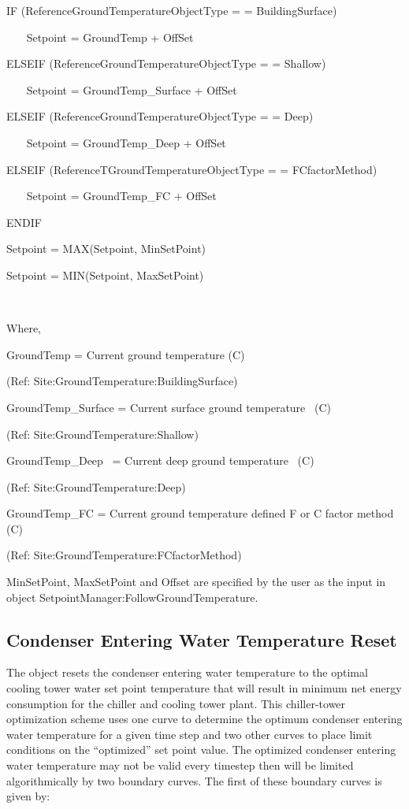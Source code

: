 IF (ReferenceGroundTemperatureObjectType = = BuildingSurface)

~~~ Setpoint = GroundTemp + OffSet

ELSEIF (ReferenceGroundTemperatureObjectType = = Shallow)

~~~ Setpoint = GroundTemp\_Surface + OffSet

ELSEIF (ReferenceGroundTemperatureObjectType = = Deep)

~~~ Setpoint = GroundTemp\_Deep + OffSet

ELSEIF (ReferenceTGroundTemperatureObjectType = = FCfactorMethod)

~~~ Setpoint = GroundTemp\_FC + OffSet

ENDIF

Setpoint = MAX(Setpoint, MinSetPoint)

Setpoint = MIN(Setpoint, MaxSetPoint)

\emph{~}

Where,

GroundTemp = Current ground temperature (C)

(Ref: Site:GroundTemperature:BuildingSurface)

GroundTemp\_Surface = Current surface ground temperature~ (C)

(Ref: Site:GroundTemperature:Shallow)

GroundTemp\_Deep~ = Current deep ground temperature~ (C)

(Ref: Site:GroundTemperature:Deep)

GroundTemp\_FC = Current ground temperature defined F or C factor method (C)

(Ref: Site:GroundTemperature:FCfactorMethod)

MinSetPoint, MaxSetPoint and Offset are specified by the user as the input in object SetpointManager:FollowGroundTemperature.

\subsection{Condenser Entering Water Temperature Reset}\label{condenser-entering-water-temperature-reset}

The object resets the condenser entering water temperature to the optimal cooling tower water set point temperature that will result in minimum net energy consumption for the chiller and cooling tower plant. This chiller-tower optimization scheme uses one curve to determine the optimum condenser entering water temperature for a given time step and two other curves to place limit conditions on the ``optimized'' set point value. The optimized condenser entering water temperature may not be valid every timestep then will be limited algorithmically by two boundary curves. The first of these boundary curves is given by:

